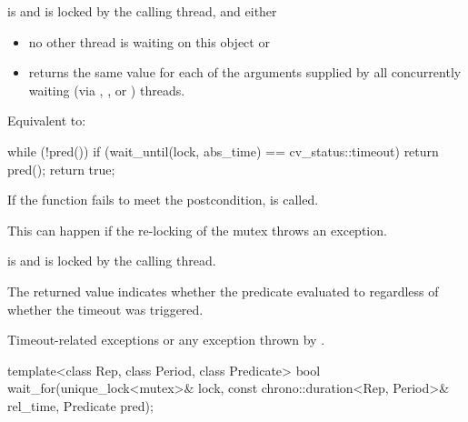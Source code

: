 \begin{itemdescr}
\pnum
\expects
{} is  and  is
locked by the calling thread, and either
\begin{itemize}
\item no other thread is waiting on this  object or
\item {} returns the same value for each of the 
arguments supplied by all concurrently waiting (via ,
, or ) threads.
\end{itemize}

\pnum
\effects
Equivalent to:
\begin{codeblock}
while (!pred())
  if (wait_until(lock, abs_time) == cv_status::timeout)
    return pred();
return true;
\end{codeblock}

\pnum
\remarks
If the function fails to meet the postcondition, 
is called.
\begin{note}
This can happen if the re-locking of the mutex throws an exception.
\end{note}

\pnum
\ensures
{} is  and 
is locked by the calling thread.

\pnum
\begin{note}
The returned value indicates whether the predicate evaluated to
 regardless of whether the timeout was triggered.
\end{note}

\pnum
\throws
Timeout-related
exceptions or any exception thrown by .
\end{itemdescr}

%
\begin{itemdecl}
template<class Rep, class Period, class Predicate>
  bool wait_for(unique_lock<mutex>& lock,
                const chrono::duration<Rep, Period>& rel_time,
                Predicate pred);
\end{itemdecl}

